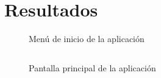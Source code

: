 \section{Resultados}


\begin{frame}
     \begin{figure}
         \caption{Menú de inicio de la aplicación}
       \end{figure}
\end{frame}

\begin{frame}
    \begin{columns}
        \column{\dimexpr\paperwidth-10pt}
        \begin{figure}
            \caption{Pantalla principal de la aplicación}
          \end{figure}
      \end{columns}
\end{frame}

